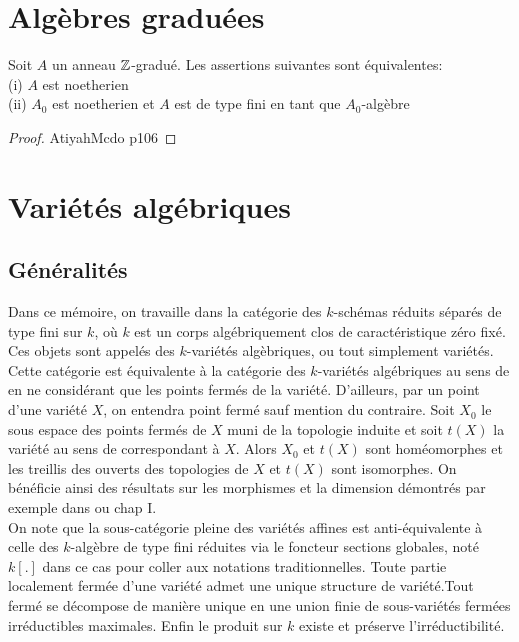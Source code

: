 \section{Algèbres graduées}

\begin{prop}\label{noethgrad}
Soit $A$ un anneau $\mathbb{Z}$-gradué. Les assertions suivantes sont équivalentes:\\
(i) $A$ est noetherien\\
(ii) $A_0$ est noetherien et $A$ est de type fini en tant que $A_0$-algèbre
\end{prop}
\begin{proof}
AtiyahMcdo p106
\end{proof}


\section{Variétés algébriques}

\subsection{Généralités}

Dans ce mémoire, on travaille dans la catégorie des $k$-schémas réduits séparés de type fini sur $k$, où $k$ est un corps algébriquement clos de caractéristique zéro fixé. Ces objets sont appelés des $k$-variétés algèbriques, ou tout simplement variétés.  Cette catégorie est équivalente à la catégorie des $k$-variétés algébriques au sens de \cite{LAGSpringer} en ne considérant que les points fermés de la variété. D'ailleurs, par un point d'une variété $X$, on entendra point fermé sauf mention du contraire. Soit $X_0$ le sous espace des points fermés de $X$ muni de la topologie induite et soit $t(X)$ la variété au sens de \cite{LAGSpringer} correspondant à $X$. Alors $X_0$ et $t(X)$ sont homéomorphes et les treillis des ouverts des topologies de $X$ et $t(X)$ sont isomorphes. On bénéficie ainsi des résultats sur les morphismes et la dimension démontrés par exemple dans \cite{LAGSpringer} ou \cite{MumfordRedBook} chap I.\\
On note que la sous-catégorie pleine des variétés affines est anti-équivalente à celle des $k$-algèbre de type fini réduites via le foncteur sections globales, noté $k[.]$ dans ce cas pour coller aux notations traditionnelles. Toute partie localement fermée d'une variété admet une unique structure de variété.Tout fermé se décompose de manière unique en une union finie de sous-variétés fermées irréductibles maximales. Enfin le produit sur $k$ existe et préserve l'irréductibilité.

